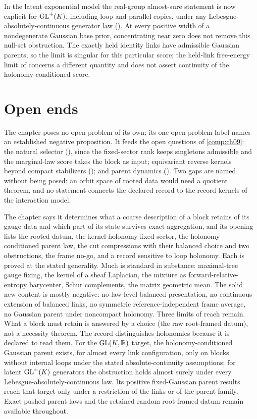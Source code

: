 In the latent exponential model the real-group almost-sure statement is now explicit for
$\mathrm{GL}^+(K)$, including loop and parallel copies, under any Lebesgue-absolutely-continuous generator
law (). At every positive width of a nondegenerate Gaussian
base prior, concentrating near zero does not remove this null-set obstruction. The exactly held
identity links have admissible Gaussian parents, so the limit is singular for this particular score;
the held-link free-energy limit of  concerns a different quantity and does
not assert continuity of the holonomy-conditioned score.

\section{Open ends}
\label{comp:ch10-open}

The chapter poses no open problem of its own; its one open-problem label names an established negative
proposition. It feeds the open questions of \cref{comp:ch09}: the natural selector
(), since the fixed-sector rank keeps singletons admissible and the
marginal-law score takes the block as input; equivariant reverse kernels beyond compact stabilizers
(); and parent dynamics (). Two
gaps are named without being posed: an orbit space of rooted data would need a quotient theorem, and no
statement connects the declared record to the record kernels of the interaction model.

\begin{verdictbox}{\DELIVERED}
The chapter says it determines what a coarse description of a block retains of its gauge data and which
part of its state survives exact aggregation, and its opening lists the rooted datum, the kernel-holonomy
fixed sector, the holonomy-conditioned parent law, the cut compressions with their balanced choice and two
obstructions, the frame no-go, and a record sensitive to loop holonomy. Each is proved at the stated
generality. Much is standard in substance: maximal-tree gauge fixing, the kernel of a sheaf Laplacian, the
mixture as forward-relative-entropy barycenter, Schur complements, the matrix geometric mean. The solid
new content is mostly negative: no law-level balanced presentation, no continuous extension of balanced
links, no symmetric reference-independent frame average, no Gaussian parent under noncompact holonomy. Three limits of reach
remain. What a block must retain is answered by a choice (the raw root-framed datum), not a necessity
theorem. The record distinguishes holonomies because it is declared to read them. For the $\mathrm{GL}(K,\mathbb R)$
target, the holonomy-conditioned Gaussian parent exists, for almost every link configuration, only on
blocks without internal loops under the stated absolute-continuity assumptions; for latent $\mathrm{GL}^+(K)$
generators the obstruction holds almost surely under every Lebesgue-absolutely-continuous law. Its
positive fixed-Gaussian parent results reach that target only under a restriction of the links or of
the parent family. Exact pushed parent laws and the retained random root-framed datum remain
available throughout.
\end{verdictbox}
